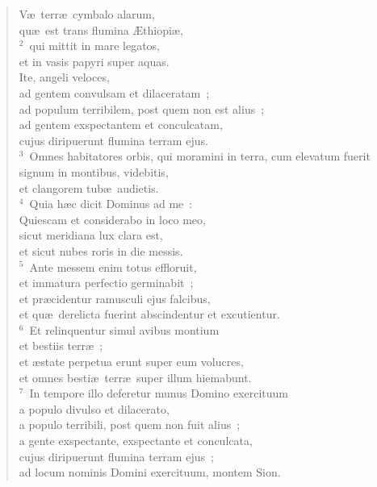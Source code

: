 \begin{flushleft}\begin{verse}\vspace{-19pt}\hspace{6pt}V\ae\ terr\ae\ cymbalo alarum,\\\hspace{6pt} qu\ae\ est trans flumina \AE thiopi\ae ,\\
${}^{2}$~qui mittit in mare legatos,\\ et in vasis papyri super aquas.\\ Ite, angeli veloces,\\ ad gentem convulsam et dilaceratam~;\\ ad populum terribilem, post quem non est alius~;\\ ad gentem exspectantem et conculcatam,\\ cujus diripuerunt flumina terram ejus.\\
${}^{3}$~Omnes habitatores orbis, qui moramini in terra, cum elevatum fuerit signum in montibus, videbitis,\\ et clangorem tub\ae\ audietis.\\
${}^{4}$~Quia h\ae c dicit Dominus ad me~:\\ Quiescam et considerabo in loco meo,\\ sicut meridiana lux clara est,\\ et sicut nubes roris in die messis.\\
${}^{5}$~Ante messem enim totus effloruit,\\ et immatura perfectio germinabit~;\\ et pr\ae cidentur ramusculi ejus falcibus,\\ et qu\ae\ derelicta fuerint abscindentur et excutientur.\\
${}^{6}$~Et relinquentur simul avibus montium\\ et bestiis terr\ae~;\\ et \ae state perpetua erunt super eum volucres,\\ et omnes besti\ae\ terr\ae\ super illum hiemabunt.\\
${}^{7}$~In tempore illo deferetur munus Domino exercituum\\ a populo divulso et dilacerato,\\ a populo terribili, post quem non fuit alius~;\\ a gente exspectante, exspectante et conculcata,\\ cujus diripuerunt flumina terram ejus~;\\ ad locum nominis Domini exercituum, montem Sion.\end{verse}\end{flushleft}


